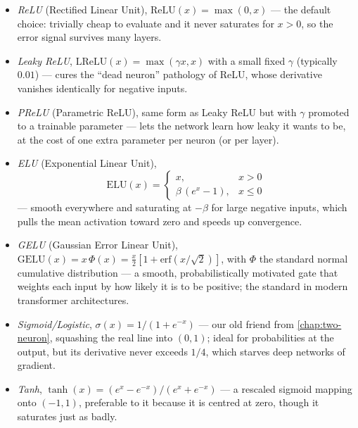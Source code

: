 \documentclass[11pt,a4paper,oneside]{book}
\theoremstyle{definition}
\theoremstyle{plain}
\theoremstyle{remark}
\begin{document}
\begin{itemize}
    \item {\it ReLU} (Rectified Linear Unit), $\mathrm{ReLU}(x)=\max(0,x)$ --- the default choice: trivially cheap to evaluate and it never saturates for $x>0$, so the error signal survives many layers.

    \item {\it Leaky ReLU}, $\mathrm{LReLU}(x)=\max(\gamma x, x)$ with a small fixed $\gamma$ (typically $0.01$) --- cures the ``dead neuron'' pathology of ReLU, whose derivative vanishes identically for negative inputs.

    \item {\it PReLU} (Parametric ReLU), same form as Leaky ReLU but with $\gamma$ promoted to a trainable parameter --- lets the network learn how leaky it wants to be, at the cost of one extra parameter per neuron (or per layer).

    \item {\it ELU} (Exponential Linear Unit),
    \begin{equation*}
        \mathrm{ELU}(x)=
        \begin{cases}
            x, & x>0\\
            \beta\,(e^{x}-1), & x\leq 0
        \end{cases}
    \end{equation*}
    --- smooth everywhere and saturating at $-\beta$ for large negative inputs, which pulls the mean activation toward zero and speeds up convergence.

    \item {\it GELU} (Gaussian Error Linear Unit), $\mathrm{GELU}(x)=x\,\Phi(x)=\frac{x}{2}\left[1+\mathrm{erf}\!\left(x/\sqrt{2}\right)\right]$, with $\Phi$ the standard normal cumulative distribution --- a smooth, probabilistically motivated gate that weights each input by how likely it is to be positive; the standard in modern transformer architectures.

    \item {\it Sigmoid/Logistic}, $\sigma(x)=1/(1+e^{-x})$ --- our old friend from \cref{chap:two-neuron}, squashing the real line into $(0,1)$; ideal for probabilities at the output, but its derivative never exceeds $1/4$, which starves deep networks of gradient.

    \item {\it Tanh}, $\tanh(x)=(e^{x}-e^{-x})/(e^{x}+e^{-x})$ --- a rescaled sigmoid mapping onto $(-1,1)$, preferable to it because it is centred at zero, though it saturates just as badly.
\end{itemize}
\end{document}
